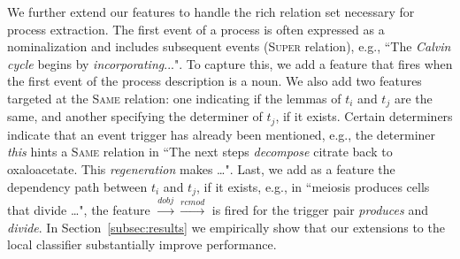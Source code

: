 
We further extend our features to handle the rich relation set necessary for process extraction. The first event of a process is often expressed as a nominalization and includes subsequent events (\textsc{Super} relation), e.g., ``The \emph{Calvin cycle} begins by \emph{incorporating}...". To capture this, we add a feature that fires when the first event of the process description is a noun. We also add two features targeted at the \textsc{Same} relation: one indicating if the lemmas of $t_i$ and $t_j$ are the same, and another specifying the determiner of $t_j$, if it exists. Certain determiners indicate that an event trigger has already been mentioned, e.g., the determiner \emph{this} hints a \textsc{Same} relation in ``The next steps \emph{decompose} citrate back to oxaloacetate. This \emph{regeneration} makes \ldots". Last, we add as a feature the dependency path between $t_i$ and $t_j$, if it exists, e.g., in ``meiosis produces cells that divide \ldots", the feature $\xrightarrow{\scriptscriptstyle dobj} \xrightarrow{\scriptscriptstyle rcmod}$ is fired for the trigger pair \emph{produces} and \emph{divide}. In Section~\ref{subsec:results} we empirically show that our extensions to the local classifier substantially improve performance.


